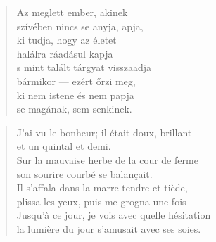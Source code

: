 \bigskip


\begin{verse}
  Az meglett ember, akinek \\
  szívében nincs se anyja, apja, \\
  ki tudja, hogy az életet \\
  halálra ráadásul kapja \\
  s mint talált tárgyat visszaadja \\
  bármikor --- ezért őrzi meg, \\
  ki nem istene és nem papja \\
  se magának, sem senkinek.
\end{verse}

\newpage


\vspace*{-15mm}
\centeredornament




\begin{verse}
  J'ai vu le bonheur; il était doux, brillant \\
  et un quintal et demi. \\
  Sur la mauvaise herbe de la cour de ferme \\
  son sourire courbé se balançait. \\
  Il s'affala dans la marre tendre et tiède, \\
  plissa les yeux, puis me grogna une fois --- \\
  Jusqu'à ce jour, je vois avec quelle hésitation \\
  la lumière du jour s'amusait avec ses soies.
\end{verse}

\bigskip



